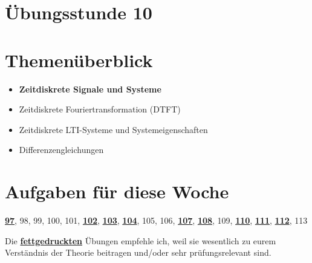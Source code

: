 \documentclass[11pt]{article}
\begin{document}
\thispagestyle{firstpage}

\setlength{\headheight}{1 \baselineskip}  %
\setlength{\parindent}{0pt}  %
\setlength{\parskip}{\baselineskip}  %

\vspace*{-5px}
\section*{Übungsstunde 10}

\section*{Themenüberblick}
\begin{itemize}
    \item \textbf{Zeitdiskrete Signale und Systeme}
    \item[] Zeitdiskrete Fouriertransformation (DTFT)
    \item[] Zeitdiskrete LTI-Systeme und Systemeigenschaften
    \item[] Differenzengleichungen
\end{itemize}

\section*{Aufgaben für diese Woche}
\vspace{-0.5cm}

\underline{\textbf{97}}, 98, 99, 100, 101, \underline{\textbf{102}}, \underline{\textbf{103}}, \underline{\textbf{104}}, 105, 106, \underline{\textbf{107}}, \underline{\textbf{108}}, 109, \underline{\textbf{110}}, \underline{\textbf{111}}, \underline{\textbf{112}}, 113\\
\vspace{-0.5cm}

Die \underline{\textbf{fettgedruckten}} Übungen empfehle ich, weil sie wesentlich zu eurem Verständnis der Theorie beitragen und/oder sehr prüfungsrelevant sind.

\vfill \null
\pagebreak
\end{document}
